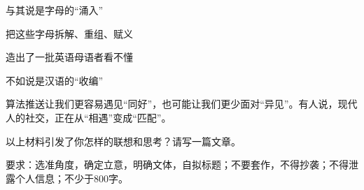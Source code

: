 \documentclass[11pt,a4paper]{ctexart}
\begin{document}
与其说是字母的“涌入”

把这些字母拆解、重组、赋义

造出了一批英语母语者看不懂

不如说是汉语的“收编”

\begin{choices}
\item {}
\item {}
\item {}
\item {}
\end{choices}


\par\vspace{2.2em}


\par\vspace{2.2em}



{\ywkai 算法推送让我们更容易遇见“同好”，也可能让我们更少面对“异见”。有人说，现代人的社交，正在从“相遇”变成“匹配”。}

以上材料引发了你怎样的联想和思考？请写一篇文章。

要求：选准角度，确定立意，明确文体，自拟标题；不要套作，不得抄袭；不得泄露个人信息；不少于800字。
\end{document}
